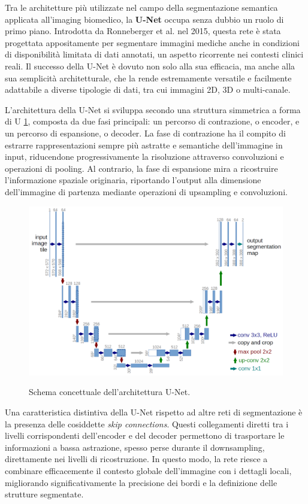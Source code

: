 
Tra le architetture più utilizzate nel campo della segmentazione semantica applicata all’imaging biomedico, la \textbf{U-Net} occupa senza dubbio un ruolo di primo piano. Introdotta da Ronneberger et al. nel 2015, questa rete è stata progettata appositamente per segmentare immagini mediche anche in condizioni di disponibilità limitata di dati annotati, un aspetto ricorrente nei contesti clinici reali. Il successo della U-Net è dovuto non solo alla sua efficacia, ma anche alla sua semplicità architetturale, che la rende estremamente versatile e facilmente adattabile a diverse tipologie di dati, tra cui immagini 2D, 3D o multi-canale.

L'architettura della U-Net si sviluppa secondo una struttura simmetrica a forma di U \ref{fig:Schema concettuale dell'architettura U-Net}, composta da due fasi principali: un percorso di contrazione, o encoder, e un percorso di espansione, o decoder. La fase di contrazione ha il compito di estrarre rappresentazioni sempre più astratte e semantiche dell’immagine in input, riducendone progressivamente la risoluzione attraverso convoluzioni e operazioni di pooling. Al contrario, la fase di espansione mira a ricostruire l’informazione spaziale originaria, riportando l’output alla dimensione dell’immagine di partenza mediante operazioni di upsampling e convoluzioni.

\begin{figure}[H]
  	\centering 
 	\includegraphics[width=.6\textwidth]{figures/U-Net-architecture.png} 
    \label{fig:Schema concettuale dell'architettura U-Net}
	\caption{Schema concettuale dell'architettura U-Net.}
 \end{figure} 

Una caratteristica distintiva della U-Net rispetto ad altre reti di segmentazione è la presenza delle cosiddette \textit{skip connections}. Questi collegamenti diretti tra i livelli corrispondenti dell’encoder e del decoder permettono di trasportare le informazioni a bassa astrazione, spesso perse durante il downsampling, direttamente nei livelli di ricostruzione. In questo modo, la rete riesce a combinare efficacemente il contesto globale dell’immagine con i dettagli locali, migliorando significativamente la precisione dei bordi e la definizione delle strutture segmentate.

